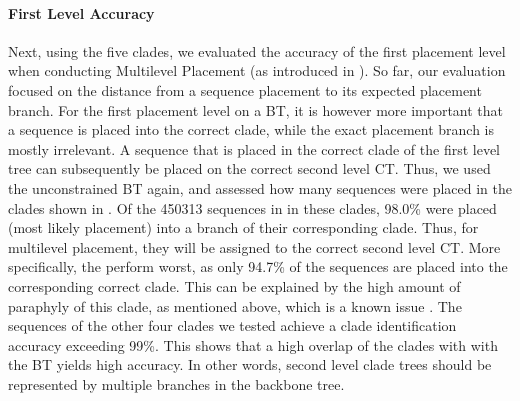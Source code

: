 \paragraph{First Level Accuracy}
\label{ch:AutomaticTrees:sec:Evaluation:sub:MultilevelPlacement:par:FirstLevelAccuracy}

Next, using the five clades, we evaluated the accuracy of the first placement level when conducting Multilevel Placement
(as introduced in ).
So far, our evaluation focused on the distance from a sequence placement to its expected placement branch.
For the first placement level on a \acf{BT}, it is however more important that a sequence is placed into the correct clade,
while the exact placement branch is mostly irrelevant.
A sequence that is placed in the correct clade of the first level tree
can subsequently be placed on the correct second level \acf{CT}.
Thus, we used the unconstrained  \ac{BT} again,
and assessed how many sequences were placed in the clades shown in .
Of the \num{450 313} sequences in  in these clades, %
98.0\% were placed (most likely placement) into a branch of their corresponding clade.
Thus, for multilevel placement, they will be assigned to the correct second level \acf{CT}.
More specifically, the  perform worst,
as only 94.7\% of the  sequences are placed into the corresponding correct clade.
This can be explained by the high amount of paraphyly of this clade, as mentioned above,
which is a known issue \citep{Parks2018}. %
The sequences of the other four clades we tested achieve a clade identification accuracy exceeding 99\%.
This shows that a high overlap of the clades with with the \ac{BT} yields high accuracy.
In other words, second level clade trees should be represented by multiple branches in the backbone tree.


